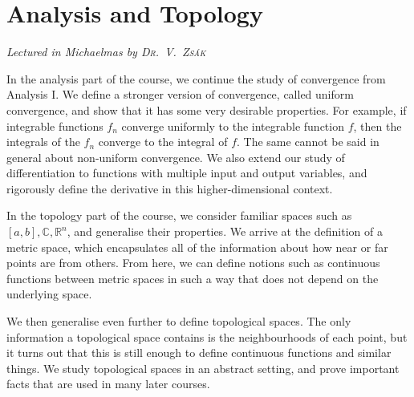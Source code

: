 \chapter[Analysis and Topology \\ \textnormal{\emph{Lectured in Michaelmas \oldstylenums{2021} by \textsc{Dr.\ V.\ Zs\'ak}}}]{Analysis and Topology}
\emph{\Large Lectured in Michaelmas  by \textsc{Dr.\ V.\ Zs\'ak}}

In the analysis part of the course, we continue the study of convergence from Analysis I.
We define a stronger version of convergence, called uniform convergence, and show that it has some very desirable properties.
For example, if integrable functions \( f_n \) converge uniformly to the integrable function \( f \), then the integrals of the \( f_n \) converge to the integral of \( f \).
The same cannot be said in general about non-uniform convergence.
We also extend our study of differentiation to functions with multiple input and output variables, and rigorously define the derivative in this higher-dimensional context.

In the topology part of the course, we consider familiar spaces such as \( [a,b], \mathbb C, \mathbb R^n \), and generalise their properties.
We arrive at the definition of a metric space, which encapsulates all of the information about how near or far points are from others.
From here, we can define notions such as continuous functions between metric spaces in such a way that does not depend on the underlying space.

We then generalise even further to define topological spaces.
The only information a topological space contains is the neighbourhoods of each point, but it turns out that this is still enough to define continuous functions and similar things.
We study topological spaces in an abstract setting, and prove important facts that are used in many later courses.


